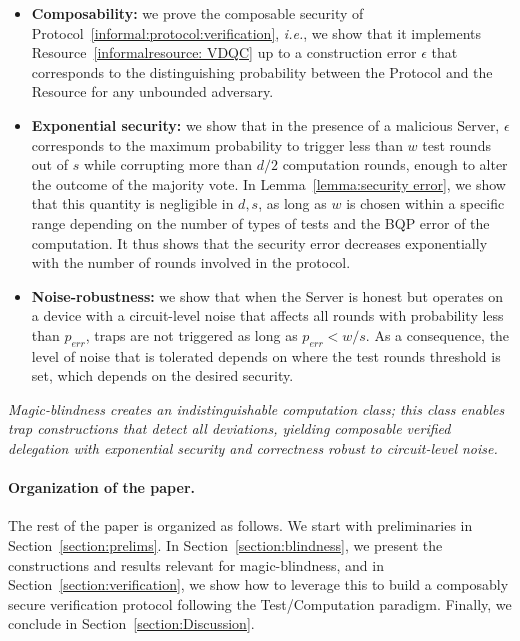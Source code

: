 \begin{itemize}
    \item \textbf{Composability:} we prove the composable security of Protocol~\ref{informal:protocol:verification}, \emph{i.e.}, we show that it implements Resource~\ref{informalresource: VDQC} up to a construction error $\epsilon$ that corresponds to the distinguishing probability between the Protocol and the Resource for any unbounded adversary.
    \item \textbf{Exponential security:} we show that in the presence of a malicious Server, $\epsilon$ corresponds to the maximum probability to trigger less than $w$ test rounds out of $s$ while corrupting more than $d/2$ computation rounds, enough to alter the outcome of the majority vote. In Lemma~\ref{lemma:security error}, we show that this quantity is negligible in $d, s$, as long as $w$ is chosen within a specific range depending on the number of types of tests and the BQP error of the computation. It thus shows that the security error decreases exponentially with the number of rounds involved in the protocol.
    \item \textbf{Noise-robustness:} we show that when the Server is honest but operates on a device with a circuit-level noise that affects all rounds with probability less than $p_{err}$,
    traps are not triggered as long as $p_{err}< w/s$. As a consequence, the level of noise that is tolerated depends on where the test rounds threshold is set, which depends on the desired security.
\end{itemize}

\begin{center}
    \textit{
        Magic-blindness creates an indistinguishable computation class; this class enables trap constructions that detect all deviations, yielding composable verified delegation with exponential security and correctness robust to circuit-level noise.
    }
\end{center}

\paragraph{Organization of the paper.} The rest of the paper is organized as follows. We start with preliminaries in Section~\ref{section:prelims}. In Section~\ref{section:blindness}, we present the constructions and results relevant for magic-blindness, and in Section~\ref{section:verification}, we show how to leverage this to build a composably secure verification protocol following the Test/Computation paradigm. Finally, we conclude in Section~\ref{section:Discussion}.
